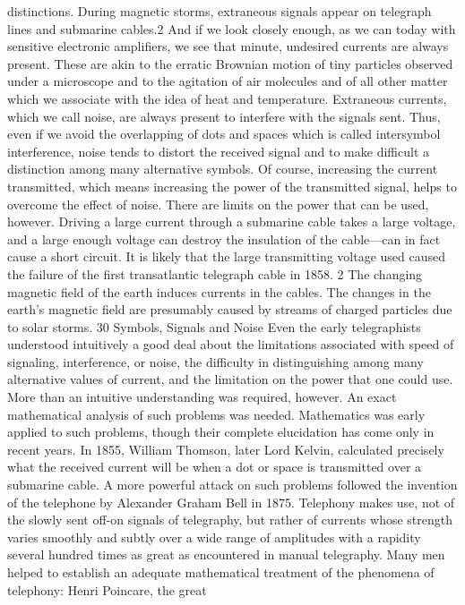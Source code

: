 distinctions. During magnetic storms, extraneous signals appear
on telegraph lines and submarine cables.2 And if we look closely
enough, as we can today with sensitive electronic amplifiers, we
see that minute, undesired currents are always present. These are
akin to the erratic Brownian motion of tiny particles observed
under a microscope and to the agitation of air molecules and of
all other matter which we associate with the idea of heat and
temperature. Extraneous currents, which we call noise, are always
present to interfere with the signals sent.
Thus, even if we avoid the overlapping of dots and spaces which
is called intersymbol interference, noise tends to distort the received
signal and to make difficult a distinction among many alternative
symbols. Of course, increasing the current transmitted, which
means increasing the power of the transmitted signal, helps to
overcome the effect of noise. There are limits on the power that
can be used, however. Driving a large current through a submarine
cable takes a large voltage, and a large enough voltage can destroy
the insulation of the cable—can in fact cause a short circuit. It is
likely that the large transmitting voltage used caused the failure
of the first transatlantic telegraph cable in 1858.
2 The changing magnetic field of the earth induces currents in the cables. The
changes in the earth’s magnetic field are presumably caused by streams of charged
particles due to solar storms.
30
Symbols, Signals and Noise
Even the early telegraphists understood intuitively a good deal
about the limitations associated with speed of signaling, interference,
or noise, the difficulty in distinguishing among many alternative
values of current, and the limitation on the power that one
could use. More than an intuitive understanding was required,
however. An exact mathematical analysis of such problems was
needed.
Mathematics was early applied to such problems, though their
complete elucidation has come only in recent years. In 1855,
William Thomson, later Lord Kelvin, calculated precisely what
the received current will be when a dot or space is transmitted over
a submarine cable. A more powerful attack on such problems
followed the invention of the telephone by Alexander Graham
Bell in 1875. Telephony makes use, not of the slowly sent off-on
signals of telegraphy, but rather of currents whose strength varies
smoothly and subtly over a wide range of amplitudes with a
rapidity several hundred times as great as encountered in manual
telegraphy.
Many men helped to establish an adequate mathematical treatment
of the phenomena of telephony: Henri Poincare, the great
